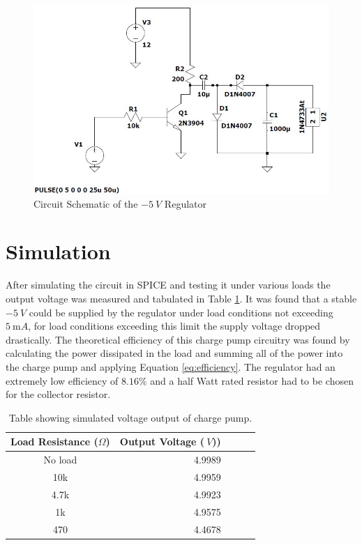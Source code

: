  \begin{figure}
    \centering
    \includegraphics[width = 0.7\linewidth]{Figures/charge_pump_schem.JPG}
    \caption{Circuit Schematic of the $\SI{-5}{V}$ Regulator}
    \label{fig:charge_pump_design}
\end{figure}

\section{Simulation} \label{sec:simulation_chargepump}
After simulating the circuit in SPICE and testing it under various loads the output voltage was measured and tabulated in Table \ref{tab:chargepumptable}. It was found that a stable $\SI{-5}{V}$ could be supplied by the regulator under load conditions not exceeding $\SI{5}{\milli A}$, for load conditions exceeding this limit the supply voltage dropped drastically. \newline The theoretical efficiency of this charge pump circuitry was found by calculating the power dissipated in the load and summing all of the power into the charge pump and applying Equation \ref{eq:efficiency}. The regulator had an extremely low efficiency of $8.16\%$ and a half Watt rated resistor had to be chosen for the collector resistor. 

\begin{table}
        \centering
        \footnotesize
        \caption{Table showing simulated voltage output of charge pump.}
         \begin{tabular}{c@{\qquad}rrrr}
          \toprule
           Load Resistance ($\Omega$) & Output Voltage ($\SI{}{V}$)) \\
           \midrule
            No load         & 4.9989 \\
            10k             & 4.9959 \\
            4.7k            & 4.9923 \\
            1k              & 4.9575 \\
            470             & 4.4678 \\
          \bottomrule
        \end{tabular}
     \label{tab:chargepumptable}
\end{table}

